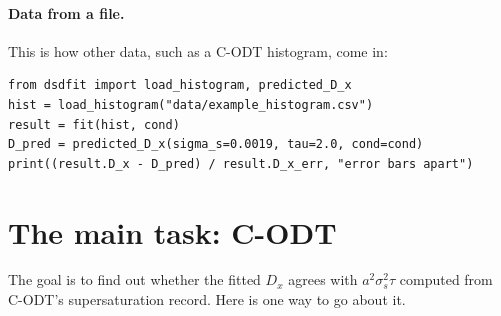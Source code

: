 \documentclass[11pt]{article}
\newcommand{\Dx}{D_x}
\begin{document}
\paragraph{Data from a file.} This is how other data, such as a C-ODT histogram, come in:
\begin{lstlisting}
from dsdfit import load_histogram, predicted_D_x
hist = load_histogram("data/example_histogram.csv")
result = fit(hist, cond)
D_pred = predicted_D_x(sigma_s=0.0019, tau=2.0, cond=cond)
print((result.D_x - D_pred) / result.D_x_err, "error bars apart")
\end{lstlisting}

\section{The main task: C-ODT}\label{sec:task}

The goal is to find out whether the fitted $\Dx$ agrees with $a^2\sigma_s^2\tau$ computed from C-ODT's
supersaturation record. Here is one way to go about it.
\end{document}
